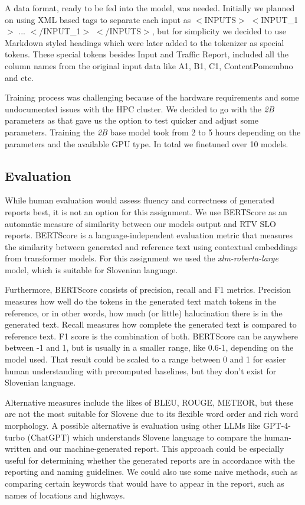 \documentclass[fleqn,moreauthors,10pt]{ds_report}
\begin{document}
A data format, ready to be fed into the model, was needed. Initially we planned on using XML based tags to separate each input as $<$INPUTS$>$ $<$INPUT\_1$>$ ... $<$/INPUT\_1$>$ $<$/INPUTS$>$, but for simplicity we decided to use Markdown styled headings which were later added to the tokenizer as special tokens. These special tokens besides Input and Traffic Report, included all the column names from the original input data like A1, B1, C1, ContentPomembno and etc.

Training process was challenging because of the hardware requirements and some undocumented issues with the HPC cluster. We decided to go with the \textit{2B} parameters as that gave us the option to test quicker and adjust some parameters. Training the \textit{2B} base model took from 2 to 5 hours depending on the parameters and the available GPU type.
In total we finetuned over 10 models.

\subsection*{Evaluation}\label{eval}
While human evaluation would assess fluency and correctness of generated reports best, it is not an option for this assignment. We use BERTScore \cite{bert-score} as an automatic measure of similarity between our models output and RTV SLO reports. BERTScore is a language-independent evaluation metric that measures the similarity between generated and reference text using contextual embeddings from transformer models. For this assignment we used the \textit{xlm-roberta-large} model, which is suitable for Slovenian language.

Furthermore, BERTScore consists of precision, recall and F1 metrics. Precision measures how well do the tokens in the generated text match tokens in the reference, or in other words, how much (or little) halucination there is in the generated text. Recall measures how complete the generated text is compared to reference text. F1 score is the combination of both. BERTScore can be anywhere between -1 and 1, but is usually in a smaller range, like 0.6-1, depending on the model used. That result could be scaled to a range between 0 and 1 for easier human understanding with precomputed baselines, but they don't exist for Slovenian language.

Alternative measures include the likes of BLEU, ROUGE, METEOR, but these are not the most suitable for Slovene due to its flexible word order and rich word morphology. %
A possible alternative is evaluation using other LLMs like GPT-4-turbo (ChatGPT) which understands Slovene language to compare the human-written and our machine-generated report. This approach could be especially useful for determining whether the generated reports are in accordance with the reporting and naming guidelines.
We could also use some naive methods, such as comparing certain keywords that would have to appear in the report, such as names of locations and highways.
\end{document}
